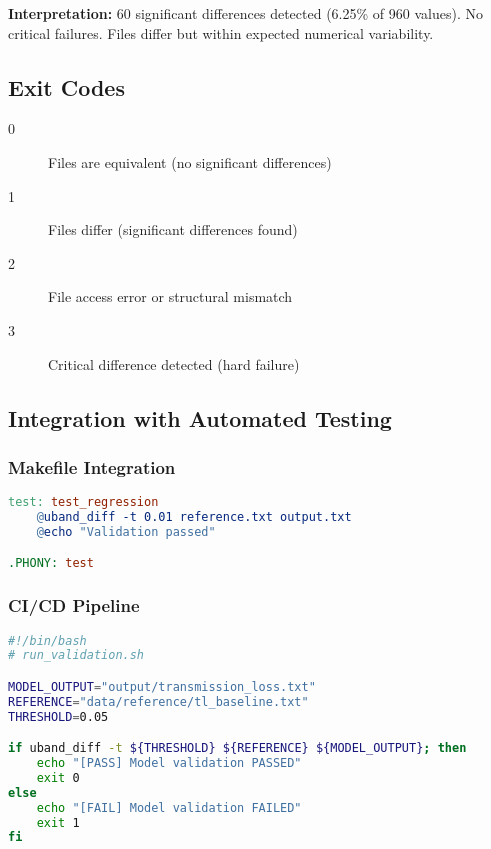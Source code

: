 \textbf{Interpretation:} 60 significant differences detected (6.25\% of 960 values). No critical failures. Files differ but within expected numerical variability.

\subsection{Exit Codes}

\begin{description}
    \item[0] Files are equivalent (no significant differences)
    \item[1] Files differ (significant differences found)
    \item[2] File access error or structural mismatch
    \item[3] Critical difference detected (hard failure)
\end{description}

\subsection{Integration with Automated Testing}

\subsubsection{Makefile Integration}

\begin{lstlisting}[language=make]
test: test_regression
	@uband_diff -t 0.01 reference.txt output.txt
	@echo "Validation passed"

.PHONY: test
\end{lstlisting}

\subsubsection{CI/CD Pipeline}

\begin{lstlisting}[language=bash]
#!/bin/bash
# run_validation.sh

MODEL_OUTPUT="output/transmission_loss.txt"
REFERENCE="data/reference/tl_baseline.txt"
THRESHOLD=0.05

if uband_diff -t ${THRESHOLD} ${REFERENCE} ${MODEL_OUTPUT}; then
    echo "[PASS] Model validation PASSED"
    exit 0
else
    echo "[FAIL] Model validation FAILED"
    exit 1
fi
\end{lstlisting}
